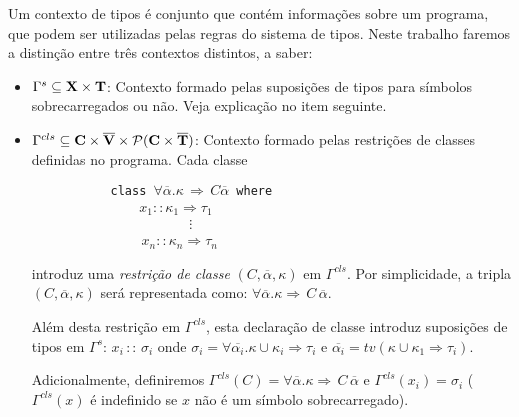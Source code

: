 Um contexto de tipos \'e conjunto que cont\'em informa\c{c}\~oes sobre um programa, que podem ser
utilizadas pelas regras do sistema de tipos. Neste trabalho faremos a distin\c{c}\~ao entre 
tr\^es contextos distintos, a saber:
\begin{itemize}
	\item $\Gamma^{s}\subseteq \text{\textbf{X}}\times\text{\textbf{T}}$: Contexto formado pelas suposi\c{c}\~oes de
	      tipos para s\'imbolos sobrecarregados ou n\~ao. Veja explica\c{c}\~ao no item seguinte.
\item $\Gamma^{cls}\subseteq\text{\textbf{C}}\times\overline{\text{\textbf{V}}}\times
       \mathcal{P}(\textbf{C}\times\overline{\text{\textbf{T}}})$:
          Contexto formado pelas restri\c{c}\~oes de classes definidas no programa. Cada classe      
\begin{flushleft}
\verb|           |\texttt{class $\forall\overline{\alpha}.\kappa\,\Rightarrow\,C\overline{\alpha}$ where}\\
\verb|               | $x_{1}::\kappa_{1}\Rightarrow\tau_{1}$\\
\verb|                      |$\vdots$\\
\verb|               |$\,x_{n}::\kappa_{n}\Rightarrow\tau_{n}$
\end{flushleft}
introduz uma \emph{restri\c{c}\~ao de classe} $(C,\overline{\alpha},\kappa)$ em $\Gamma^{cls}$. Por simplicidade,
a tripla $(C,\overline{\alpha},\kappa)$ ser\'a representada como:
$\forall\overline{\alpha}.\kappa\Rightarrow\,C\,\overline{\alpha}$. 

Al\'em desta restri\c{c}\~ao em $\Gamma^{cls}$, esta declara\c{c}\~ao de classe introduz  
suposi\c{c}\~oes de tipos em $\Gamma^{s}$: $x_{i}\,::\,\sigma_{i}$
onde $\sigma_{i}=\forall\overline{\alpha_{i}}.\kappa\cup\kappa_{i}\Rightarrow\tau_{i}$ e
$\overline{\alpha_{i}}=tv(\kappa\cup\kappa_{1}\Rightarrow\tau_{i})$.
 
Adicionalmente, definiremos $\Gamma^{cls}(C)=\forall\overline{\alpha}.\kappa\Rightarrow\,C\,\overline{\alpha}$ e
$\Gamma^{cls}(x_{i})=\sigma_{i}$ ($\Gamma^{cls}(x)$ \'e indefinido se $x$ n\~ao \'e um s\'imbolo sobrecarregado).


\end{itemize}
